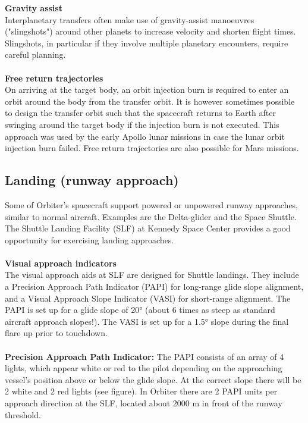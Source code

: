 \documentclass[Orbiter User Manual.tex]{subfiles}
\begin{document}
\noindent
\textbf{Gravity assist}\\
Interplanetary transfers often make use of gravity-assist manoeuvres ("slingshots") around other planets to increase velocity and shorten flight times. Slingshots, in particular if they involve multiple planetary encounters, require careful planning.\\
\\
\textbf{Free return trajectories}\\
On arriving at the target body, an orbit injection burn is required to enter an orbit around the body from the transfer orbit. It is however sometimes possible to design the transfer orbit such that the spacecraft returns to Earth after swinging around the target body if the injection burn is not executed. This approach was used by the early Apollo lunar missions in case the lunar orbit injection burn failed. Free return trajectories are also possible for Mars missions.


\subsection{Landing (runway approach)}
\label{ssec:basic_landing}
Some of Orbiter's spacecraft support powered or unpowered runway approaches, similar to normal aircraft. Examples are the Delta-glider and the Space Shuttle. The Shuttle Landing Facility (SLF) at Kennedy Space Center provides a good opportunity for exercising landing approaches.\\
\\
\textbf{Visual approach indicators}\\
The visual approach aids at SLF are designed for Shuttle landings. They include a Precision Approach Path Indicator (PAPI) for long-range glide slope alignment, and a Visual Approach Slope Indicator (VASI) for short-range alignment. The PAPI is set up for a glide slope of 20° (about 6 times as steep as standard aircraft approach slopes!). The VASI is set up for a 1.5° slope during the final flare up prior to touchdown.\\
\\
\textbf{Precision Approach Path Indicator:} The PAPI consists of an array of 4 lights, which appear white or red to the pilot depending on the approaching vessel's position above or below the glide slope. At the correct slope there will be 2 white and 2 red lights (see figure). In Orbiter there are 2 PAPI units per approach direction at the SLF, located about 2000 m in front of the runway threshold.
\end{document}

